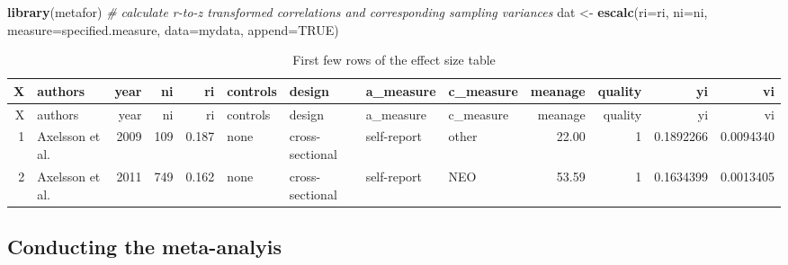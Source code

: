 \documentclass[]{article}
\newenvironment{Shaded}{\begin{snugshade}}{\end{snugshade}}
\newcommand{\KeywordTok}[1]{\textcolor[rgb]{0.13,0.29,0.53}{\textbf{#1}}}
\newcommand{\DataTypeTok}[1]{\textcolor[rgb]{0.13,0.29,0.53}{#1}}
\newcommand{\StringTok}[1]{\textcolor[rgb]{0.31,0.60,0.02}{#1}}
\newcommand{\CommentTok}[1]{\textcolor[rgb]{0.56,0.35,0.01}{\textit{#1}}}
\newcommand{\OtherTok}[1]{\textcolor[rgb]{0.56,0.35,0.01}{#1}}
\newcommand{\NormalTok}[1]{#1}
\begin{document}
\begin{Shaded}
\begin{Highlighting}[]
\KeywordTok{library}\NormalTok{(metafor)}
\CommentTok{# calculate r-to-z transformed correlations and corresponding sampling variances}
\NormalTok{dat <-}\StringTok{ }\KeywordTok{escalc}\NormalTok{(}\DataTypeTok{ri=}\NormalTok{ri, }\DataTypeTok{ni=}\NormalTok{ni, }\DataTypeTok{measure=}\NormalTok{specified.measure, }\DataTypeTok{data=}\NormalTok{mydata, }\DataTypeTok{append=}\OtherTok{TRUE}\NormalTok{)}
\end{Highlighting}
\end{Shaded}

\begin{longtable}[]{@{}rlrrrllllrrrr@{}}
\caption{First few rows of the effect size table}\tabularnewline
\toprule
X & authors & year & ni & ri & controls & design & a\_measure &
c\_measure & meanage & quality & yi & vi\tabularnewline
\midrule
\endfirsthead
\toprule
X & authors & year & ni & ri & controls & design & a\_measure &
c\_measure & meanage & quality & yi & vi\tabularnewline
\midrule
\endhead
1 & Axelsson et al. & 2009 & 109 & 0.187 & none & cross-sectional &
self-report & other & 22.00 & 1 & 0.1892266 & 0.0094340\tabularnewline
2 & Axelsson et al. & 2011 & 749 & 0.162 & none & cross-sectional &
self-report & NEO & 53.59 & 1 & 0.1634399 & 0.0013405\tabularnewline
\bottomrule
\end{longtable}

\subsection{Conducting the
meta-analyis}\label{conducting-the-meta-analyis}
\end{document}
